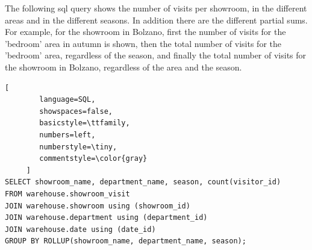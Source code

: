 \documentclass[letterpaper,12pt]{article}
\begin{document}
The following sql query shows the number of visits per showroom, in the different areas and in the different seasons. In addition there are the different partial sums. For example, for the showroom in Bolzano, first the number of visits for the 'bedroom' area in autumn is shown, then the total number of visits for the 'bedroom' area, regardless of the season, and finally the total number of visits for the showroom in Bolzano, regardless of the area and the season.

\begin{lstlisting}[
        language=SQL,
        showspaces=false,
        basicstyle=\ttfamily,
        numbers=left,
        numberstyle=\tiny,
        commentstyle=\color{gray}
     ]
SELECT showroom_name, department_name, season, count(visitor_id)
FROM warehouse.showroom_visit
JOIN warehouse.showroom using (showroom_id)
JOIN warehouse.department using (department_id)
JOIN warehouse.date using (date_id)
GROUP BY ROLLUP(showroom_name, department_name, season);
\end{lstlisting}
\end{document}

